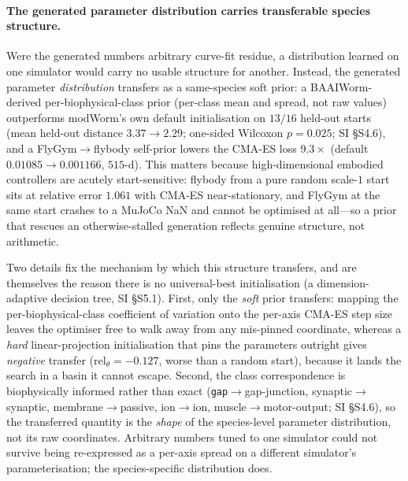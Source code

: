 \documentclass[11pt]{article}
\begin{document}
\paragraph{The generated parameter distribution carries transferable species structure.} Were the generated numbers arbitrary curve-fit residue, a distribution learned on one simulator would carry no usable structure for another. Instead, the generated parameter \emph{distribution} transfers as a same-species soft prior: a BAAIWorm-derived per-biophysical-class prior (per-class mean and spread, not raw values) outperforms modWorm's own default initialisation on $13/16$ held-out starts (mean held-out distance $3.37\to2.29$; one-sided Wilcoxon $p{=}0.025$; SI \S S4.6), and a FlyGym$\to$flybody self-prior lowers the CMA-ES loss $9.3\times$ (default $0.01085\to0.001166$, $515$-d). This matters because high-dimensional embodied controllers are acutely start-sensitive: flybody from a pure random scale-$1$ start sits at relative error $1.061$ with CMA-ES near-stationary, and FlyGym at the same start crashes to a MuJoCo NaN and cannot be optimised at all---so a prior that rescues an otherwise-stalled generation reflects genuine structure, not arithmetic.

Two details fix the mechanism by which this structure transfers, and are themselves the reason there is no universal-best initialisation (a dimension-adaptive decision tree, SI \S S5.1). First, only the \emph{soft} prior transfers: mapping the per-biophysical-class coefficient of variation onto the per-axis CMA-ES step size leaves the optimiser free to walk away from any mis-pinned coordinate, whereas a \emph{hard} linear-projection initialisation that pins the parameters outright gives \emph{negative} transfer ($\mathrm{rel}_\theta{=}-0.127$, worse than a random start), because it lands the search in a basin it cannot escape. Second, the class correspondence is biophysically informed rather than exact (\texttt{gap}$\to$gap-junction, synaptic$\to$synaptic, membrane$\to$passive, ion$\to$ion, muscle$\to$motor-output; SI \S S4.6), so the transferred quantity is the \emph{shape} of the species-level parameter distribution, not its raw coordinates. Arbitrary numbers tuned to one simulator could not survive being re-expressed as a per-axis spread on a different simulator's parameterisation; the species-specific distribution does.
\end{document}
